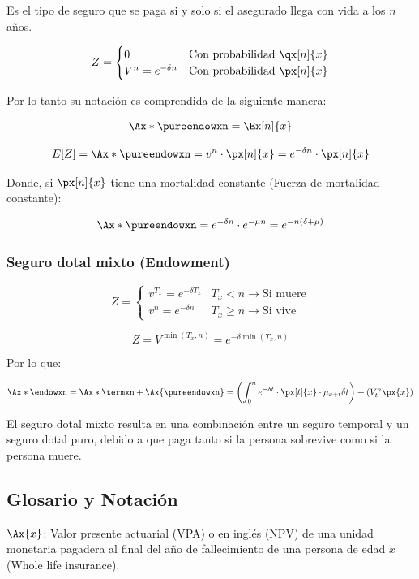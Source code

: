 \documentclass[12pt, a4paper, footinclude=true]{scrbook}
\begin{document}
Es el tipo de seguro que se paga si y solo si el asegurado llega con vida a los $n$ años. 

$$
	Z = 
	\begin{cases}
		0 & \text{Con probabilidad $\qx[n]{x}$} \\
		V^n = e^{-\delta n} & \text{Con probabilidad $\px[n]{x}$} 
	\end{cases}
$$

Por lo tanto su notación es comprendida de la siguiente manera: 

$$ \Ax*{\pureendowxn} = \Ex[n]{x}$$

$$E[Z] = \Ax*{\pureendowxn} = v^n \cdot \px[n]{x} = e^{-\delta n} \cdot \px[n]{x}$$

Donde, si $\px[n]{x}$ tiene una mortalidad constante (Fuerza de mortalidad constante):

$$\Ax*{\pureendowxn} = e^{-\delta n} \cdot e^{-\mu n} = e^{-n(\delta + \mu)}$$

\subsubsection{Seguro dotal mixto (Endowment)}

\[
	Z = 
	\begin{cases}
		v^{T_x} = e^{-\delta T_x} & T_x < n \rightarrow \text{Si muere} \\
		
		v^n = e^{-\delta n} & T_x \geq n \rightarrow \text{Si vive}
	\end{cases}
\]

\[
	Z = V^{\min(T_x, n)} = e^{-\delta \min(T_x, n)}
\]

Por lo que: 

\[
	\Ax*{\endowxn} = \Ax*{\termxn} + \Ax{\pureendowxn}	= \left( \int_{0}^{n} e^{-\delta t} \cdot \px[t]{x} \cdot \mu_{x+t} \delta t\right) + \left( V_{t}^{n} \px{x} \right)
\]

El seguro dotal mixto resulta en una combinación entre un seguro temporal y un seguro dotal puro, debido a que paga tanto si la persona sobrevive como si la persona muere. 

\subsection{Glosario y Notación}

$\Ax{x}$: Valor presente actuarial (VPA) o en inglés (NPV) de una unidad monetaria pagadera al final del año de fallecimiento de una persona de edad $x$ (Whole life insurance).\\
\end{document}
